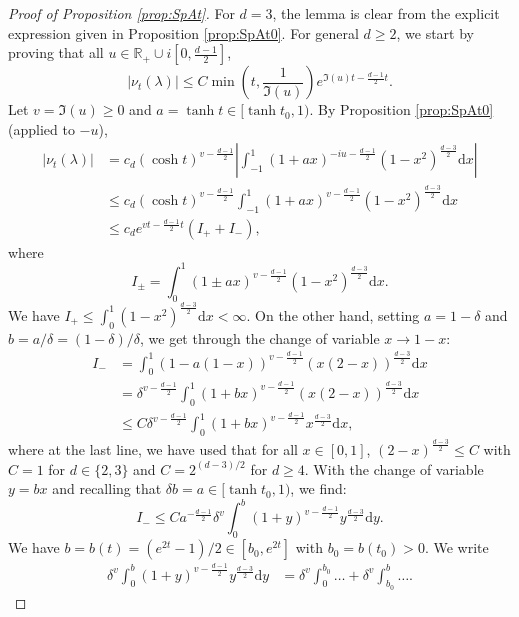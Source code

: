 \documentclass[]{scrartcl}
\newcommand{\R}{\mathds{R}}
\renewcommand{\d}{\mathrm{d}}
\numberwithin{equation}{section}
\numberwithin{figure}{section}
\begin{document}
\begin{proof}[Proof of Proposition \ref{prop:SpAt}]
	For $d=3$, the lemma is clear from the explicit expression given in Proposition \ref{prop:SpAt0}. For general $d \geq 2$, we start by proving that all $u \in \R_+ \cup i \left[0, \frac{d-1}{2}\right]$,
	\begin{equation}\label{eq:bdnut1}
		|\nu_t(\lambda)|  \leq C  \min \left( t, \frac{1}{\Im(u)} \right)  e^{ \Im (u)  t-\frac{d-1}{2}t}.
	\end{equation}
	Let $v = \Im(u) \geq 0$ and $a = \tanh t \in [\tanh t_0,1)$. By Proposition \ref{prop:SpAt0} (applied to $-u$), 
	\begin{align*}
		|  \nu_t (\lambda) | &= c_d (\cosh t )^{v - \frac{d-1}{2}} \left| \int_{-1}^{1} ( 1+ a x)^{-iu - \frac{d-1}{2}} ( 1- x^2)^{ \frac{d - 3}{2}} \d x \right| \\
		& \leq c_d (\cosh t )^{v - \frac{d-1}{2}}  \int_{-1}^{1} ( 1+ a x)^{v - \frac{d-1}{2}} ( 1- x^2)^{ \frac{d - 3}{2}}\d x \\
		& \leq c_d e^{v  t-\frac{d-1}{2}t} \left( I_+ + I_-\right),
	\end{align*}
	where 
	$$
	I_{\pm} = \int_{0}^{1} ( 1 \pm a x)^{v - \frac{d-1}{2}} ( 1- x^2)^{ \frac{d - 3}{2}}\d x.
	$$
	We have $I_+ \leq  \int_{0}^{1}   ( 1- x^2)^{ \frac{d - 3}{2}}\d x < \infty$. On the other hand, setting $a =  1- \delta$ and $b = a / \delta = (1 -\delta) / \delta$, we get through the change of variable $x \to 1 -x$:
	\begin{align*}
		I_- & = 	\int_{0}^{1} ( 1 - a (1-x) )^{v - \frac{d-1}{2}} ( x (2 -x) )^{ \frac{d - 3}{2}}\d x	\\
		& =  \delta^{v - \frac{d-1}{2}} \int_{0}^{1} ( 1 + b x )^{v - \frac{d-1}{2}} ( x (2 -x) )^{ \frac{d - 3}{2}}\d x \\
		& \leq C \delta^{v - \frac{d-1}{2}} \int_{0}^{1} ( 1 + b x )^{v - \frac{d-1}{2}}  x  ^{ \frac{d - 3}{2}}\d x, 
	\end{align*}		
	where at the last line, we have used that for all $x \in [0,1]$, $(2 -x)^{ \frac{d - 3}{2}} \leq C$ with $C = 1$ for $d \in \{2,3\}$ and $C = 2^{(d-3)/2}$ for $d \geq 4$. With the change of variable $y = bx$ and recalling that $\delta b = a \in [\tanh t_0,1)$, we find: 
	$$
	I_- \leq C a^{-\frac{d-1}{2}} \delta^{v}  \int_{0}^{b} ( 1 + y )^{v - \frac{d-1}{2}}  y  ^{ \frac{d - 3}{2}}\d y.
	$$
	We have $b = b(t) = (e^{2t} - 1)/ 2 \in [b_0,e^{2t}]$ with $b_0 = b(t_0) >0$. We write
	\begin{align*}
		\delta^{v}  \int_{0}^{b} ( 1 + y )^{v - \frac{d-1}{2}}  y  ^{ \frac{d - 3}{2}}\d y & = \delta^{v}  \int_{0}^{b_0} \dots +  \delta^{v}  \int_{b_0}^{b} \dots.

\end{align*}
\end{proof}
\end{document}
